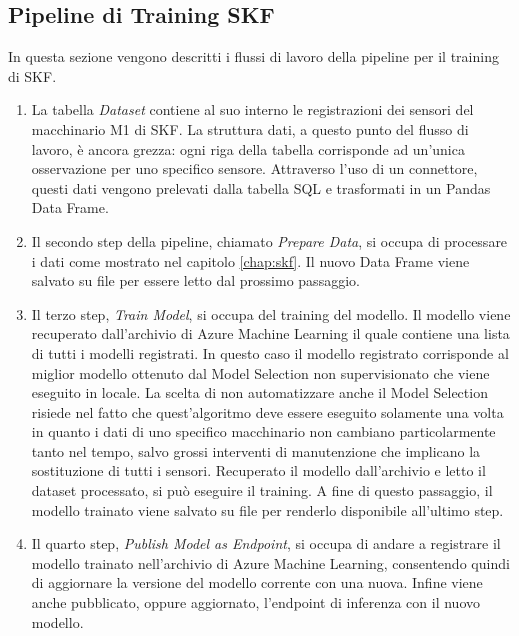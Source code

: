 \subsection{Pipeline di Training SKF}
In questa sezione vengono descritti i flussi di lavoro della pipeline per il training di SKF.
\begin{enumerate}
	\item La tabella \textit{Dataset} contiene al suo interno le registrazioni dei sensori del macchinario M1 di SKF. La struttura dati, a questo punto del flusso di lavoro, è ancora grezza: ogni riga della tabella corrisponde ad un'unica osservazione per uno specifico sensore. Attraverso l'uso di un connettore, questi dati vengono prelevati dalla tabella SQL e trasformati in un Pandas Data Frame.
	\item Il secondo step della pipeline, chiamato \textit{Prepare Data}, si occupa di processare i dati come mostrato nel capitolo \ref{chap:skf}. Il nuovo Data Frame viene salvato su file per essere letto dal prossimo passaggio.
	\item Il terzo step, \textit{Train Model}, si occupa del training del modello. Il modello viene recuperato dall'archivio di Azure Machine Learning il quale contiene una lista di tutti i modelli registrati. In questo caso il modello registrato corrisponde al miglior modello ottenuto dal Model Selection non supervisionato che viene eseguito in locale. La scelta di non automatizzare anche il Model Selection risiede nel fatto che quest'algoritmo deve essere eseguito solamente una volta in quanto i dati di uno specifico macchinario non cambiano particolarmente tanto nel tempo, salvo grossi interventi di manutenzione che implicano la sostituzione di tutti i sensori. Recuperato il modello dall'archivio e letto il dataset processato, si può eseguire il training. A fine di questo passaggio, il modello trainato viene salvato su file per renderlo disponibile all'ultimo step.
	\item Il quarto step, \textit{Publish Model as Endpoint}, si occupa di andare a registrare il modello trainato nell'archivio di Azure Machine Learning, consentendo quindi di aggiornare la versione del modello corrente con una nuova. Infine viene anche pubblicato, oppure aggiornato, l'endpoint di inferenza con il nuovo modello.
\end{enumerate}



